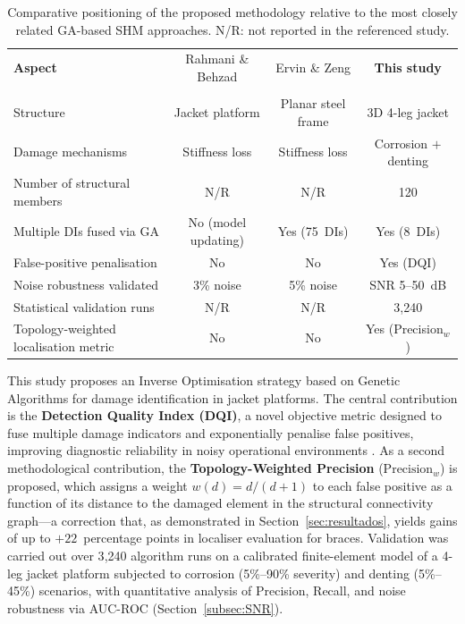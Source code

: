 \documentclass[preprint,12pt]{elsarticle}
\begin{document}
\begin{table}[!ht]
  \centering
  \small
  \caption{Comparative positioning of the proposed methodology relative to the most closely related GA-based SHM approaches. N/R: not reported in the referenced study.}
  \label{tab:comparison_sota}
  \begin{tabular}{lccc}
    \toprule
    \textbf{Aspect} & Rahmani \& Behzad & Ervin \& Zeng & \textbf{This study} \\
                    & \citep{rahmani2013ga} & \citep{ervin2022index} & \\
    \midrule
    Structure                            & Jacket platform        & Planar steel frame     & 3D 4-leg jacket        \\
    Damage mechanisms                    & Stiffness loss         & Stiffness loss         & Corrosion $+$ denting  \\
    Number of structural members         & N/R                    & N/R                    & 120                    \\
    Multiple DIs fused via GA            & No (model updating)    & Yes (75~DIs)           & Yes (8~DIs)            \\
    False-positive penalisation          & No                     & No                     & Yes (DQI)              \\
    Noise robustness validated           & 3\% noise              & 5\% noise              & SNR 5--50~dB           \\
    Statistical validation runs          & N/R                    & N/R                    & 3{,}240                \\
    Topology-weighted localisation metric& No                     & No                     & Yes (Precision$_w$)    \\
    \bottomrule
  \end{tabular}
\end{table}

This study proposes an Inverse Optimisation strategy based on Genetic Algorithms for damage identification in jacket platforms. The central contribution is the \textbf{Detection Quality Index (DQI)}, a novel objective metric designed to fuse multiple damage indicators and exponentially penalise false positives, improving diagnostic reliability in noisy operational environments \citep{malekzadeh2013damage}. As a second methodological contribution, the \textbf{Topology-Weighted Precision} ($\text{Precision}_w$) is proposed, which assigns a weight $w(d) = d/(d+1)$ to each false positive as a function of its distance to the damaged element in the structural connectivity graph---a correction that, as demonstrated in Section~\ref{sec:resultados}, yields gains of up to $+22$~percentage points in localiser evaluation for braces. Validation was carried out over 3{,}240 algorithm runs on a calibrated finite-element model of a 4-leg jacket platform subjected to corrosion (5\%--90\% severity) and denting (5\%--45\%) scenarios, with quantitative analysis of Precision, Recall, and noise robustness via AUC-ROC (Section~\ref{subsec:SNR}).
\end{document}
